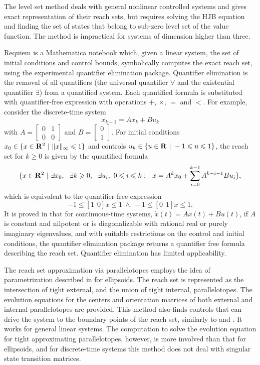 The level set method \cite{mitchell,levelset} deals with general
nonlinear controlled systems and gives exact representation of
their reach sets, but requires solving the HJB equation and finding
the set of states that belong to sub-zero level set of the value function.
The method \cite{levelset} is impractical for systems of dimension higher
than three.

Requiem \cite{requiem} is a Mathematica notebook which, given a linear system,
the set of initial conditions and control bounds, symbolically computes
the exact reach set, using the experimental quantifier elimination package.
Quantifier elimination is the removal of all quantifiers (the universal
quantifier $\forall$ and the existential quantifier $\exists$) from a quantified
system. Each quantified formula is substituted with quantifier-free expression
with operations $+$, $\times$, $=$ and $<$. For example, consider the
discrete-time system
\[ x_{k+1} = Ax_k + Bu_k \]
with $A=\left[\begin{array}{cc}
0 & 1\\
0 & 0\end{array}\right]$ and $B=\left[\begin{array}{c}
0\\
1\end{array}\right]$.  For initial conditions
$x_0\in\{x\in {\bf R}^2 ~|~ \|x\|_{\infty} \leq 1\}$ and controls
$u_k\in\{u\in {\bf R} ~|~ -1\leq u\leq1\}$, the reach set for  $k\geq0$
is given by the quantified formula
\[\{ x\in{\bf R}^2 ~|~ \exists x_0, ~~ \exists k\geq 0, ~~
\exists u_i, ~ 0\leq i\leq k: ~~
x = A^kx_0+\sum_{i=0}^{k-1}A^{k-i-1}Bu_i \}, \]
which is equivalent to the quantifier-free expression
\[ -1\leq[1 ~~ 0]x\leq1 ~ \wedge ~ -1\leq[0 ~~ 1]x\leq1. \]
It is proved in \cite{yovine} that for continuous-time systems,
$\dot{x}(t) = Ax(t) + Bu(t)$, if $A$ is constant and nilpotent or
is diagonalizable with rational real or purely imaginary eigenvalues,
and with suitable restrictions on the control and initial conditions,
the quantifier elimination package returns a quantifier free formula
describing the reach set. Quantifier elimination has limited applicability.

The reach set approximation via parallelotopes \cite{kostousova} employs
the idea of parametrization described in \cite{kurvar} for ellipsoids.
The reach set is represented as the intersection of tight external,
and the union of tight internal, parallelotopes.
The evolution equations for the centers and
orientation matrices of both external and internal parallelotopes are
provided. This method also finds controls that can drive the system to
the boundary points of the reach set, similarly to \cite{varaiya}
and \cite{kurvar}. It works for general linear systems.  The
computation to solve the evolution equation for tight approximating
parallelotopes, however, is more involved than that for ellipsoids,
and for discrete-time systems this method does not deal with singular state
transition matrices.

